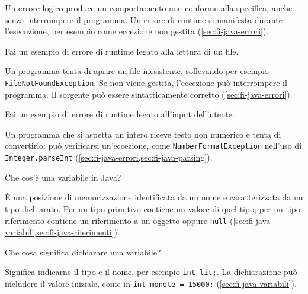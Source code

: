 Un errore logico produce un comportamento non conforme alla specifica, anche
senza interrompere il programma. Un errore di runtime si manifesta durante
l'esecuzione, per esempio come eccezione non gestita (\cref{sec:fi-java-errori}).

\begin{exercise}
\label{ex:fi-esercizi-introduzione-java-errore-file}
Fai un esempio di errore di runtime legato alla lettura di un file.
\end{exercise}

Un programma tenta di aprire un file inesistente, sollevando per esempio
\texttt{FileNotFoundException}. Se non viene gestita, l'eccezione può
interrompere il programma. Il sorgente può essere sintatticamente corretto
(\cref{sec:fi-java-errori}).

\begin{exercise}
\label{ex:fi-esercizi-introduzione-java-errore-input}
Fai un esempio di errore di runtime legato all'input dell'utente.
\end{exercise}

Un programma che si aspetta un intero riceve testo non numerico e tenta di
convertirlo: può verificarsi un'eccezione, come \texttt{NumberFormatException}
nell'uso di \texttt{Integer.parseInt}
(\cref{sec:fi-java-errori,sec:fi-java-parsing}).

\begin{exercise}
\label{ex:fi-esercizi-introduzione-java-variabile}
Che cos'è una variabile in Java?
\end{exercise}

È una posizione di memorizzazione identificata da un nome e caratterizzata
da un tipo dichiarato. Per un tipo primitivo contiene un valore di quel tipo;
per un tipo riferimento contiene un riferimento a un oggetto oppure
\texttt{null} (\cref{sec:fi-java-variabili,sec:fi-java-riferimenti}).

\begin{exercise}
\label{ex:fi-esercizi-introduzione-java-dichiarazione}
Che cosa significa dichiarare una variabile?
\end{exercise}

Significa indicarne il tipo e il nome, per esempio \texttt{int lit;}. La
dichiarazione può includere il valore iniziale, come in \texttt{int monete =
15000;} (\cref{sec:fi-java-variabili}).
